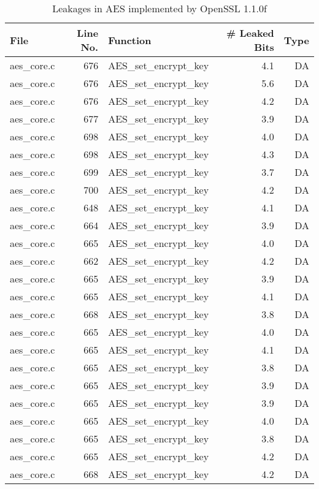 \begin{table}[!ht]
\centering\tiny\scriptsize
\renewcommand{\baselinestretch}{0.96}\selectfont
\caption{Leakages in AES implemented by OpenSSL 1.1.0f}\label{tab:AESOpenSSL1.1.0f}
\begin{tabular}{lrlrr}
\hline
\textbf{File} & \textbf{Line No.} & \textbf{Function} & \textbf{\# Leaked Bits} & \textbf{Type} \\\hline
aes\_core.c& 676&AES\_set\_encrypt\_key&4.1 &DA\\
aes\_core.c& 676&AES\_set\_encrypt\_key&5.6 &DA\\
aes\_core.c& 676&AES\_set\_encrypt\_key&4.2 &DA\\
aes\_core.c& 677&AES\_set\_encrypt\_key&3.9 &DA\\
aes\_core.c& 698&AES\_set\_encrypt\_key&4.0 &DA\\
aes\_core.c& 698&AES\_set\_encrypt\_key&4.3 &DA\\
aes\_core.c& 699&AES\_set\_encrypt\_key&3.7 &DA\\
aes\_core.c& 700&AES\_set\_encrypt\_key&4.2 &DA\\
aes\_core.c& 648&AES\_set\_encrypt\_key&4.1 &DA\\
aes\_core.c& 664&AES\_set\_encrypt\_key&3.9 &DA\\
aes\_core.c& 665&AES\_set\_encrypt\_key&4.0 &DA\\
aes\_core.c& 662&AES\_set\_encrypt\_key&4.2 &DA\\
aes\_core.c& 665&AES\_set\_encrypt\_key&3.9 &DA\\
aes\_core.c& 665&AES\_set\_encrypt\_key&4.1 &DA\\
aes\_core.c& 668&AES\_set\_encrypt\_key&3.8 &DA\\
aes\_core.c& 665&AES\_set\_encrypt\_key&4.0 &DA\\
aes\_core.c& 665&AES\_set\_encrypt\_key&4.1 &DA\\
aes\_core.c& 665&AES\_set\_encrypt\_key&3.8 &DA\\
aes\_core.c& 665&AES\_set\_encrypt\_key&3.9 &DA\\
aes\_core.c& 665&AES\_set\_encrypt\_key&3.9 &DA\\
aes\_core.c& 665&AES\_set\_encrypt\_key&4.0 &DA\\
aes\_core.c& 665&AES\_set\_encrypt\_key&3.8 &DA\\
aes\_core.c& 665&AES\_set\_encrypt\_key&4.2 &DA\\
aes\_core.c& 668&AES\_set\_encrypt\_key&4.2 &DA\\

\end{tabular}
\end{table}

